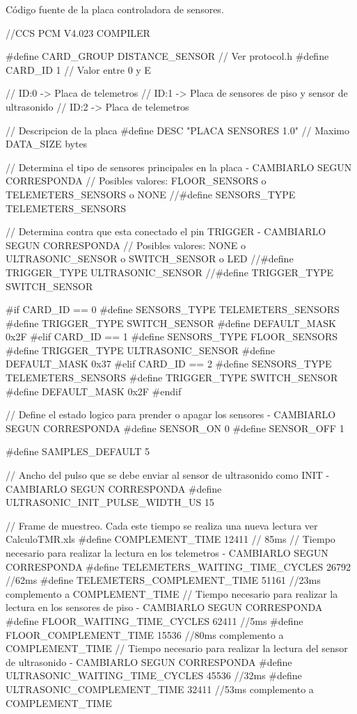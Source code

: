 C\'odigo fuente de la placa controladora de sensores.

{\scriptsize
\begin{verbatimtab}
//CCS PCM V4.023 COMPILER

#define CARD_GROUP	DISTANCE_SENSOR	// Ver protocol.h
#define CARD_ID		1		// Valor entre 0 y E

// ID:0 -> Placa de telemetros
// ID:1 -> Placa de sensores de piso y sensor de ultrasonido
// ID:2 -> Placa de telemetros

// Descripcion de la placa
#define DESC		"PLACA SENSORES 1.0" // Maximo DATA_SIZE bytes

// Determina el tipo de sensores principales en la placa - CAMBIARLO SEGUN CORRESPONDA
// Posibles valores: FLOOR_SENSORS o TELEMETERS_SENSORS o NONE
//#define SENSORS_TYPE	TELEMETERS_SENSORS

// Determina contra que esta conectado el pin TRIGGER - CAMBIARLO SEGUN CORRESPONDA
// Posibles valores: NONE o ULTRASONIC_SENSOR o SWITCH_SENSOR o LED
//#define TRIGGER_TYPE	ULTRASONIC_SENSOR
//#define TRIGGER_TYPE	SWITCH_SENSOR

#if CARD_ID == 0
	#define SENSORS_TYPE	TELEMETERS_SENSORS
	#define TRIGGER_TYPE	SWITCH_SENSOR
	#define DEFAULT_MASK	0x2F
#elif CARD_ID == 1
	#define SENSORS_TYPE	FLOOR_SENSORS
	#define TRIGGER_TYPE	ULTRASONIC_SENSOR
	#define DEFAULT_MASK	0x37
#elif CARD_ID == 2
	#define SENSORS_TYPE	TELEMETERS_SENSORS
	#define TRIGGER_TYPE	SWITCH_SENSOR
	#define DEFAULT_MASK	0x2F
#endif

// Define el estado logico para prender o apagar los sensores - CAMBIARLO SEGUN CORRESPONDA
#define SENSOR_ON	0
#define SENSOR_OFF	1

#define SAMPLES_DEFAULT 5

// Ancho del pulso que se debe enviar al sensor de ultrasonido como INIT - CAMBIARLO SEGUN CORRESPONDA
#define ULTRASONIC_INIT_PULSE_WIDTH_US	15

// Frame de muestreo. Cada este tiempo se realiza una nueva lectura ver CalculoTMR.xls
#define COMPLEMENT_TIME					12411 // 85ms
// Tiempo necesario para realizar la lectura en los telemetros - CAMBIARLO SEGUN CORRESPONDA
#define TELEMETERS_WAITING_TIME_CYCLES	26792 //62ms
#define TELEMETERS_COMPLEMENT_TIME		51161 //23ms complemento a COMPLEMENT_TIME
// Tiempo necesario para realizar la lectura en los sensores de piso - CAMBIARLO SEGUN CORRESPONDA
#define FLOOR_WAITING_TIME_CYCLES		62411 //5ms
#define FLOOR_COMPLEMENT_TIME			15536 //80ms complemento a COMPLEMENT_TIME
// Tiempo necesario para realizar la lectura del sensor de ultrasonido - CAMBIARLO SEGUN CORRESPONDA
#define ULTRASONIC_WAITING_TIME_CYCLES	45536 //32ms
#define ULTRASONIC_COMPLEMENT_TIME		32411 //53ms complemento a COMPLEMENT_TIME


\end{verbatimtab}}
